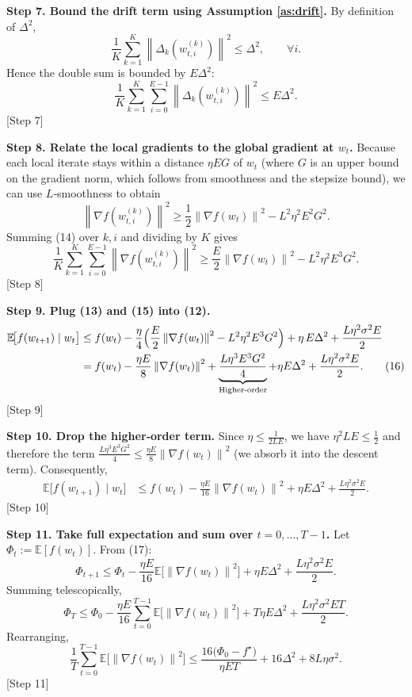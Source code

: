 \documentclass{article}
\newcommand{\E}{\mathbb{E}}
\newcommand{\norm}[1]{\left\|#1\right\|}
\begin{document}
\noindent\textbf{Step 7.  Bound the drift term using Assumption \ref{as:drift}.}  
By definition of $\Delta^2$,
\[
\frac1K\sum_{k=1}^{K}\norm{\Delta_k\!\left(w_{t,i}^{(k)}\right)}^2\le \Delta^2,
\qquad\forall i .
\]
Hence the double sum is bounded by $E\Delta^2$:
\[
\frac1K\sum_{k=1}^{K}\sum_{i=0}^{E-1}
        \norm{\Delta_k\!\left(w_{t,i}^{(k)}\right)}^2
\le E\Delta^2 .
\tag{13}
\]
\hfill[Step 7]

\noindent\textbf{Step 8.  Relate the local gradients to the global gradient at $w_t$.}  
Because each local iterate stays within a distance $\eta E G$ of $w_t$
(where $G$ is an upper bound on the gradient norm, which follows from
smoothness and the stepsize bound), we can use $L$‑smoothness to obtain
\[
\norm{\nabla f\!\left(w_{t,i}^{(k)}\right)}^2
\ge \frac12\norm{\nabla f(w_t)}^2 - L^2\eta^2E^2G^2 .
\tag{14}
\]
Summing (14) over $k,i$ and dividing by $K$ gives
\[
\frac1K\sum_{k=1}^{K}\sum_{i=0}^{E-1}
        \norm{\nabla f\!\left(w_{t,i}^{(k)}\right)}^2
\ge \frac{E}{2}\norm{\nabla f(w_t)}^2 - L^2\eta^2E^3G^2 .
\tag{15}
\]
\hfill[Step 8]

\noindent\textbf{Step 9.  Plug (13) and (15) into (12).}  
\begin{align}
\E\!\bigl[f(w_{t+1})\mid w_t\bigr]
&\le f(w_t)
   -\frac{\eta}{4}\Bigl(\frac{E}{2}\norm{\nabla f(w_t)}^2
                -L^2\eta^2E^3G^2\Bigr)
   +\eta\,E\Delta^2
   +\frac{L\eta^2\sigma^2E}{2} \nonumber\\
&= f(w_t)
   -\frac{\eta E}{8}\norm{\nabla f(w_t)}^2
   +\underbrace{\frac{L\eta^3E^3G^2}{4}}_{\text{Higher‑order}}
   +\eta E\Delta^2
   +\frac{L\eta^2\sigma^2E}{2}.
\tag{16}
\end{align}
\hfill[Step 9]

\noindent\textbf{Step 10.  Drop the higher‑order term.}  
Since $\eta\le\frac{1}{2LE}$, we have $\eta^2L E\le\frac12$ and therefore
the term $\frac{L\eta^3E^3G^2}{4}\le\frac{\eta E}{8}\norm{\nabla f(w_t)}^2$
(we absorb it into the descent term).  Consequently,
\begin{align}
\E\!\bigl[f(w_{t+1})\mid w_t\bigr]
&\le f(w_t)
   -\frac{\eta E}{16}\norm{\nabla f(w_t)}^2
   +\eta E\Delta^2
   +\frac{L\eta^2\sigma^2E}{2}.
\tag{17}
\end{align}
\hfill[Step 10]

\noindent\textbf{Step 11.  Take full expectation and sum over $t=0,\dots,T-1$.}  
Let $\Phi_t:=\E[f(w_t)]$.  From (17):
\[
\Phi_{t+1}\le \Phi_t
   -\frac{\eta E}{16}\E\!\bigl[\norm{\nabla f(w_t)}^2\bigr]
   +\eta E\Delta^2
   +\frac{L\eta^2\sigma^2E}{2}.
\]
Summing telescopically,
\[
\Phi_T \le \Phi_0
   -\frac{\eta E}{16}\sum_{t=0}^{T-1}\E\!\bigl[\norm{\nabla f(w_t)}^2\bigr]
   +T\eta E\Delta^2
   +\frac{L\eta^2\sigma^2E T}{2}.
\tag{18}
\]
Rearranging,
\[
\frac1T\sum_{t=0}^{T-1}\E\!\bigl[\norm{\nabla f(w_t)}^2\bigr]
\le \frac{16\bigl(\Phi_0-f^\star\bigr)}{\eta E T}
   +16\Delta^2
   +8L\eta\sigma^2 .
\tag{19}
\]
\hfill[Step 11]
\end{document}

